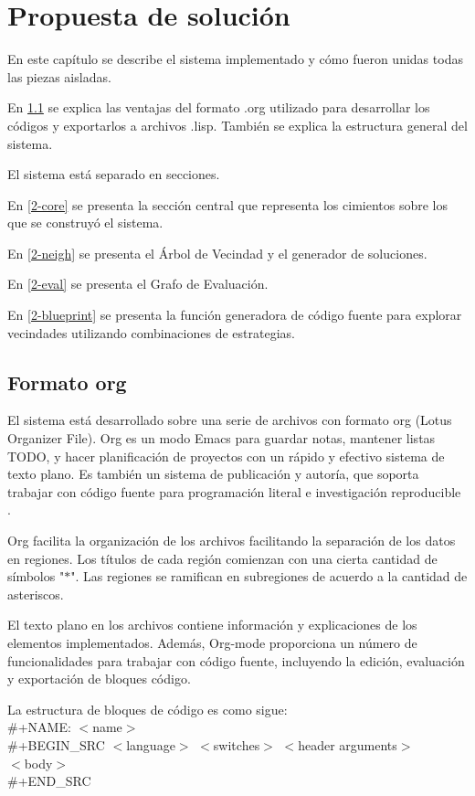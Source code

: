 \chapter{Propuesta de solución}\label{chapter:Solution}

En este capítulo se describe el sistema implementado y cómo fueron unidas todas las piezas aisladas.

En \ref{2-org} se explica las ventajas del formato .org utilizado para desarrollar los códigos y exportarlos a archivos .lisp. También se explica la estructura general del sistema.

El sistema está separado en secciones.

En \ref{2-core} se presenta la sección central que representa los cimientos sobre los que se construyó el sistema.

En \ref{2-neigh} se presenta el Árbol de Vecindad y el generador de soluciones.

En \ref{2-eval} se presenta el Grafo de Evaluación.

En \ref{2-blueprint} se presenta la función generadora de código fuente para explorar vecindades utilizando combinaciones de estrategias.

\section{Formato org}\label{2-org}
El sistema está desarrollado sobre una serie de archivos con formato org (Lotus Organizer File). Org es un modo Emacs para guardar notas, mantener listas TODO, y hacer planificación de proyectos con un rápido y efectivo sistema de texto plano. Es también un sistema de publicación y autoría, que soporta trabajar con código fuente para programación literal e investigación reproducible \cite{TODO}.

Org facilita la organización de los archivos facilitando la separación de los datos en regiones. Los títulos de cada región comienzan con una cierta cantidad de símbolos "$\ast$". Las regiones se ramifican en subregiones de acuerdo a la cantidad de asteriscos.

El texto plano en los archivos contiene información y explicaciones de los elementos implementados. Además, Org-mode proporciona un número de funcionalidades para trabajar con código fuente, incluyendo la edición, evaluación y exportación de bloques código.

La estructura de bloques de código es como sigue:\\
\#+NAME: $<$name$>$\\
\#+BEGIN\_SRC $<$language$>$ $<$switches$>$ $<$header arguments$>$\\
$<$body$>$\\
\#+END\_SRC

